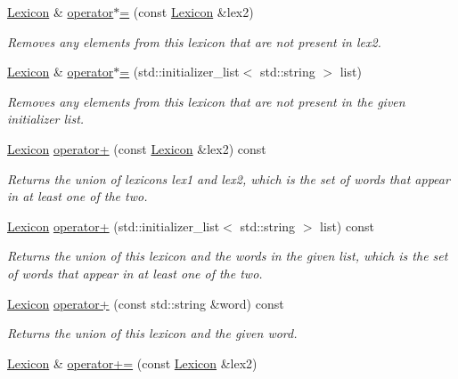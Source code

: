 \begin{DoxyCompactItemize}
\mbox{\hyperlink{classLexicon}{Lexicon}} \& \mbox{\hyperlink{classLexicon_ab81e3c0d6a5637202849784ef00b9cd5}{operator$\ast$=}} (const \mbox{\hyperlink{classLexicon}{Lexicon}} \&lex2)
\begin{DoxyCompactList}\small\item\em Removes any elements from this lexicon that are not present in {\ttfamily lex2}. \end{DoxyCompactList}\item 
\mbox{\hyperlink{classLexicon}{Lexicon}} \& \mbox{\hyperlink{classLexicon_a79ada3cb64d9f074114ce895c67be781}{operator$\ast$=}} (std\+::initializer\+\_\+list$<$ std\+::string $>$ list)
\begin{DoxyCompactList}\small\item\em Removes any elements from this lexicon that are not present in the given initializer list. \end{DoxyCompactList}\item 
\mbox{\hyperlink{classLexicon}{Lexicon}} \mbox{\hyperlink{classLexicon_acfc41a903b549304f3b70e48fd2e52e4}{operator+}} (const \mbox{\hyperlink{classLexicon}{Lexicon}} \&lex2) const
\begin{DoxyCompactList}\small\item\em Returns the union of lexicons {\ttfamily lex1} and {\ttfamily lex2}, which is the set of words that appear in at least one of the two. \end{DoxyCompactList}\item 
\mbox{\hyperlink{classLexicon}{Lexicon}} \mbox{\hyperlink{classLexicon_a4436a915b6de75438364ed061e0e9491}{operator+}} (std\+::initializer\+\_\+list$<$ std\+::string $>$ list) const
\begin{DoxyCompactList}\small\item\em Returns the union of this lexicon and the words in the given list, which is the set of words that appear in at least one of the two. \end{DoxyCompactList}\item 
\mbox{\hyperlink{classLexicon}{Lexicon}} \mbox{\hyperlink{classLexicon_a44774af5311cf2c8fd054ecf8ff8e76b}{operator+}} (const std\+::string \&word) const
\begin{DoxyCompactList}\small\item\em Returns the union of this lexicon and the given word. \end{DoxyCompactList}\item 
\mbox{\hyperlink{classLexicon}{Lexicon}} \& \mbox{\hyperlink{classLexicon_afa70421c28007f127e7c4b24666ecc3a}{operator+=}} (const \mbox{\hyperlink{classLexicon}{Lexicon}} \&lex2)

\end{DoxyCompactItemize}
